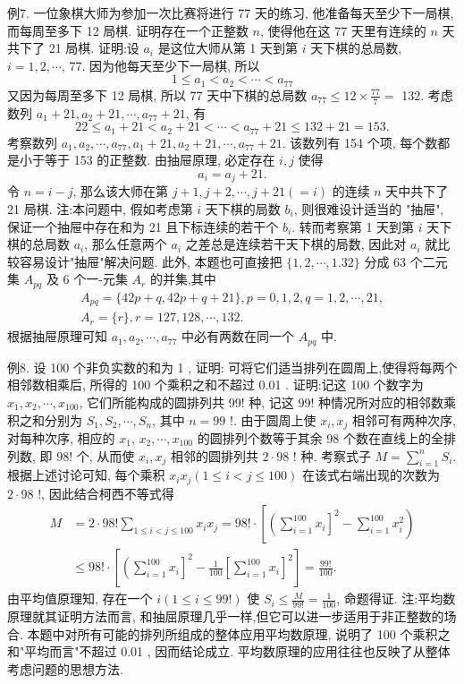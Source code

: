 例7. 一位象棋大师为参加一次比赛将进行 77 天的练习, 他准备每天至少下一局棋,而每周至多下 12 局棋.
证明存在一个正整数 $n$, 使得他在这 77 天里有连续的 $n$ 天共下了 21 局棋.
证明:设 $a_i$ 是这位大师从第 1 天到第 $i$ 天下棋的总局数, $i=1,2, \cdots$, 77. 因为他每天至少下一局棋, 所以
$$
1 \leqslant a_1<a_2<\cdots<a_{77}
$$
又因为每周至多下 12 局棋, 所以 77 天中下棋的总局数 $a_{77} \leqslant 12 \times \frac{77}{7}=$ 132.
考虑数列 $a_1+21, a_2+21, \cdots, a_{77}+21$, 有
$$
22 \leqslant a_1+21<a_2+21<\cdots<a_{77}+21 \leqslant 132+21=153 .
$$
考察数列 $a_1, a_2, \cdots, a_{77}, a_1+21, a_2+21, \cdots, a_{77}+21$. 该数列有 154 个项, 每个数都是小于等于 153 的正整数.
由抽屉原理, 必定存在 $i, j$ 使得
$$
a_i=a_j+21 .
$$
令 $n=i-j$, 那么该大师在第 $j+1, j+2, \cdots, j+21(=i)$ 的连续 $n$ 天中共下了 21 局棋.
注:本问题中, 假如考虑第 $i$ 天下棋的局数 $b_i$, 则很难设计适当的 "抽屉", 保证一个抽屉中存在和为 21 且下标连续的若干个 $b_i$. 转而考察第 1 天到第 $i$ 天下棋的总局数 $a_i$, 那么任意两个 $a_i$ 之差总是连续若干天下棋的局数, 因此对 $a_i$ 就比较容易设计"抽屉"解决问题.
此外, 本题也可直接把 $\{1,2, \cdots, 1.32\}$ 分成 63 个二元集 $A_{p q}$ 及 6 个一-元集 $A_r$ 的并集,其中
$$
\begin{gathered}
A_{p q}=\{42 p+q, 42 p+q+21\}, p=0,1,2, q=1,2, \cdots, 21, \\
A_r=\{r\}, r=127,128, \cdots, 132 .
\end{gathered}
$$
根据抽屉原理可知 $a_1, a_2, \cdots, a_{77}$ 中必有两数在同一个 $A_{p q}$ 中.



例8. 设 100 个非负实数的和为 1 , 证明: 可将它们适当排列在圆周上,使得将每两个相邻数相乘后, 所得的 100 个乘积之和不超过 0.01 .
证明:记这 100 个数字为 $x_1, x_2, \cdots, x_{100}$, 它们所能构成的圆排列共 99! 种, 记这 99! 种情况所对应的相邻数乘积之和分别为 $S_1, S_2, \cdots, S_n$, 其中 $n=99$ !.
由于圆周上使 $x_i, x_j$ 相邻可有两种次序, 对每种次序, 相应的 $x_1$, $x_2, \cdots, x_{100}$ 的圆排列个数等于其余 98 个数在直线上的全排列数, 即 $98 !$ 个, 从而使 $x_i, x_j$ 相邻的圆排列共 $2 \cdot 98$ ! 种.
考察式子 $M=\sum_{i=1}^n S_i$.
根据上述讨论可知, 每个乘积 $x_i x_j(1 \leqslant i<j \leqslant 100)$ 在该式右端出现的次数为 $2 \cdot 98$ !, 因此结合柯西不等式得
$$
\begin{aligned}
M & =2 \cdot 98 ! \sum_{1 \leqslant i<j \leqslant 100} x_i x_j=98 ! \cdot\left[\left(\sum_{i=1}^{100} x_i\right]^2-\sum_{i=1}^{100} x_i^2\right) \\
& \leqslant 98 ! \cdot\left[\left(\sum_{i=1}^{100} x_i\right]^2-\frac{1}{100}\left[\sum_{i=1}^{100} x_i\right]^2\right]=\frac{99 !}{100} .
\end{aligned}
$$
由平均值原理知, 存在一个 $i(1 \leqslant i \leqslant 99 !)$ 使 $S_i \leqslant \frac{M}{99 !}=\frac{1}{100}$, 命题得证.
注:平均数原理就其证明方法而言, 和抽屈原理几乎一样,但它可以进一步适用于非正整数的场合.
本题中对所有可能的排列所组成的整体应用平均数原理, 说明了 100 个乘积之和"平均而言"不超过 0.01 , 因而结论成立.
平均数原理的应用往往也反映了从整体考虑问题的思想方法.



